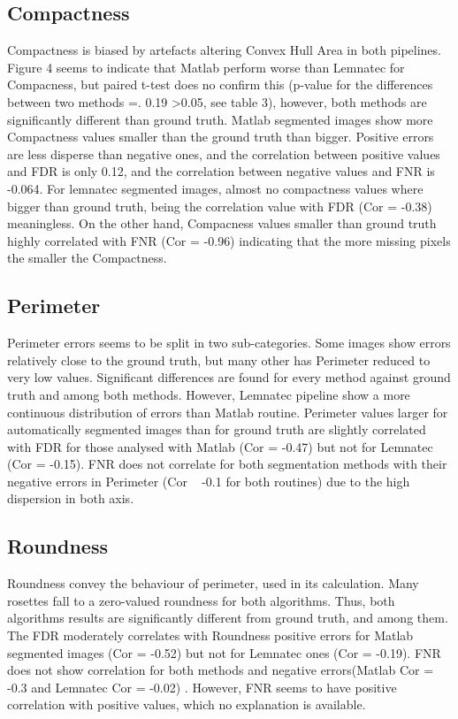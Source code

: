 \documentclass{frontiersSCNS} %
\begin{document}
\subsection{Compactness}
Compactness is biased by artefacts altering Convex Hull Area in both pipelines. Figure 4 seems to indicate that Matlab perform worse than Lemnatec for Compacness, but paired t-test does no confirm this (p-value for the differences between two methods =. 0.19 >0.05, see table 3), however, both methods are significantly different than ground truth. Matlab segmented images show more Compactness values smaller than the ground truth than bigger. Positive errors are less disperse than negative ones, and the correlation between positive values and FDR is only 0.12, and the correlation between negative values and FNR is -0.064. For lemnatec segmented images, almost no compactness values where bigger than ground truth, being the correlation value with FDR (Cor = -0.38) meaningless. On the other hand, Compacness values smaller than ground truth highly correlated with FNR (Cor = -0.96) indicating that the more missing pixels the smaller the Compactness.
\subsection{Perimeter}
Perimeter errors seems to be split in two sub-categories. Some images show errors relatively close to the ground truth, but many other has Perimeter reduced to very low values. Significant differences are found for every method against ground truth and among both methods. However, Lemnatec pipeline show a more continuous distribution of errors than Matlab routine. Perimeter values larger for automatically segmented images than for ground truth are slightly correlated with FDR for those analysed with Matlab (Cor = -0.47) but not for Lemnatec (Cor = -0.15). FNR does not correlate for both segmentation methods with their negative errors in Perimeter (Cor ~ -0.1 for both routines) due to the high dispersion in both axis.
\subsection{Roundness}
Roundness convey the behaviour of perimeter, used in its calculation. Many rosettes fall to a zero-valued roundness for both algorithms. Thus, both algorithms results are significantly different from ground truth, and among them. The FDR moderately correlates with Roundness positive errors for Matlab segmented images (Cor = -0.52) but not for Lemnatec ones (Cor = -0.19). FNR does not show correlation for both methods and negative errors(Matlab Cor = -0.3 and Lemnatec Cor = -0.02) . However, FNR seems to have positive correlation with positive values, which no explanation is available.
\end{document}

